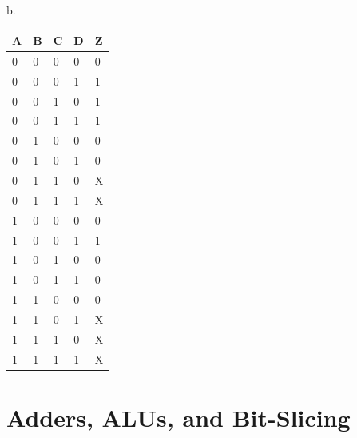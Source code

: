 \documentclass{article}
\begin{document}
b.
\begin{table}[!h]
\centering
\begin{tabular}{|l|l|l|l|l|}
\hline
\textbf{A} & \textbf{B} & \textbf{C} & \textbf{D} & \textbf{Z} \\ \hline
0          & 0          & 0          & 0          & 0          \\ \hline
0          & 0          & 0          & 1          & 1          \\ \hline
0          & 0          & 1          & 0          & 1          \\ \hline
0          & 0          & 1          & 1          & 1          \\ \hline
0          & 1          & 0          & 0          & 0          \\ \hline
0          & 1          & 0          & 1          & 0          \\ \hline
0          & 1          & 1          & 0          & X          \\ \hline
0          & 1          & 1          & 1          & X          \\ \hline
1          & 0          & 0          & 0          & 0          \\ \hline
1          & 0          & 0          & 1          & 1          \\ \hline
1          & 0          & 1          & 0          & 0          \\ \hline
1          & 0          & 1          & 1          & 0          \\ \hline
1          & 1          & 0          & 0          & 0          \\ \hline
1          & 1          & 0          & 1          & X          \\ \hline
1          & 1          & 1          & 0          & X          \\ \hline
1          & 1          & 1          & 1          & X          \\ \hline
\end{tabular}
\end{table}

\newpage
\section*{Adders, ALUs, and Bit-Slicing}
\end{document}
